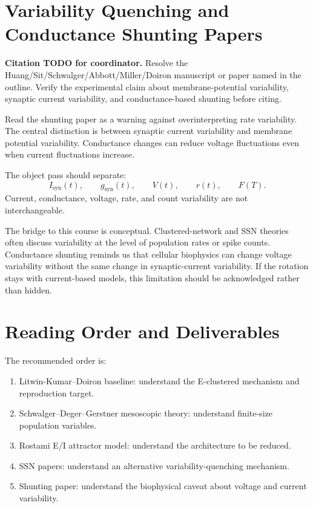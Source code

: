 \section{Variability Quenching and Conductance Shunting Papers}
\label{app:reading-shunting}

\textbf{Citation TODO for coordinator.} Resolve the Huang/Sit/Schwalger/Abbott/Miller/Doiron manuscript or paper named in the outline. Verify the experimental claim about membrane-potential variability, synaptic current variability, and conductance-based shunting before citing.

Read the shunting paper as a warning against overinterpreting rate variability. The central distinction is between synaptic current variability and membrane potential variability. Conductance changes can reduce voltage fluctuations even when current fluctuations increase.

The object pass should separate:
%
\begin{equation}
  I_{\mathrm{syn}}(t),
  \qquad
  g_{\mathrm{syn}}(t),
  \qquad
  V(t),
  \qquad
  r(t),
  \qquad
  F(T).
  \label{eq:shunting-reading-objects}
\end{equation}
%
Current, conductance, voltage, rate, and count variability are not interchangeable.

The bridge to this course is conceptual. Clustered-network and SSN theories often discuss variability at the level of population rates or spike counts. Conductance shunting reminds us that cellular biophysics can change voltage variability without the same change in synaptic-current variability. If the rotation stays with current-based models, this limitation should be acknowledged rather than hidden.

\section{Reading Order and Deliverables}
\label{app:reading-order-deliverables}

The recommended order is:
%
\begin{enumerate}[leftmargin=*]
  \item Litwin-Kumar--Doiron baseline: understand the E-clustered mechanism and reproduction target.
  \item Schwalger--Deger--Gerstner mesoscopic theory: understand finite-size population variables.
  \item Rostami E/I attractor model: understand the architecture to be reduced.
  \item SSN papers: understand an alternative variability-quenching mechanism.
  \item Shunting paper: understand the biophysical caveat about voltage and current variability.
\end{enumerate}

